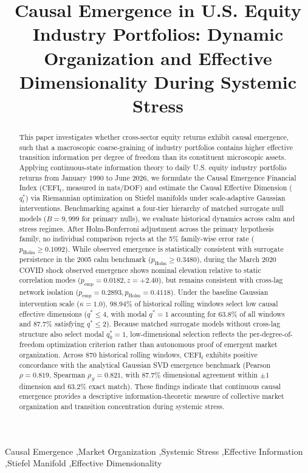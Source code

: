 \documentclass[review,12pt,authoryear]{elsarticle}
\begin{document}
\begin{frontmatter}

\title{Causal Emergence in U.S. Equity Industry Portfolios: Dynamic Organization and Effective Dimensionality During Systemic Stress}

\author{}

\begin{abstract}
This paper investigates whether cross-sector equity returns exhibit causal emergence, such that a macroscopic coarse-graining of industry portfolios contains higher effective transition information per degree of freedom than its constituent microscopic assets. Applying continuous-state information theory to daily U.S. equity industry portfolio returns from January 1990 to June 2026, we formulate the Causal Emergence Financial Index ($\mathrm{CEFI}_t$, measured in $\mathrm{nats/DOF}$) and estimate the Causal Effective Dimension ($q_t^*$) via Riemannian optimization on Stiefel manifolds under scale-adaptive Gaussian interventions. Benchmarking against a four-tier hierarchy of matched surrogate null models ($B=9,999$ for primary nulls), we evaluate historical dynamics across calm and stress regimes. After Holm-Bonferroni adjustment across the primary hypothesis family, no individual comparison rejects at the 5\% family-wise error rate ($p_{\text{Holm}} \ge 0.1092$). While observed emergence is statistically consistent with surrogate persistence in the 2005 calm benchmark ($p_{\text{Holm}} \ge 0.3480$), during the March 2020 COVID shock observed emergence shows nominal elevation relative to static correlation modes ($p_{\text{emp}} = 0.0182, z = +2.40$), but remains consistent with cross-lag network isolation ($p_{\text{emp}} = 0.2893, p_{\text{Holm}} = 0.4118$). Under the baseline Gaussian intervention scale ($\kappa = 1.0$), 98.94\% of historical rolling windows select low causal effective dimensions ($q^* \le 4$, with modal $q^* = 1$ accounting for 63.8\% of all windows and 87.7\% satisfying $q^* \le 2$). Because matched surrogate models without cross-lag structure also select modal $q_0^* = 1$, low-dimensional selection reflects the per-degree-of-freedom optimization criterion rather than autonomous proof of emergent market organization. Across 870 historical rolling windows, $\mathrm{CEFI}_t$ exhibits positive concordance with the analytical Gaussian SVD emergence benchmark (Pearson $\rho = 0.819$, Spearman $\rho_S = 0.821$, with 87.7\% dimensional agreement within $\pm 1$ dimension and 63.2\% exact match). These findings indicate that continuous causal emergence provides a descriptive information-theoretic measure of collective market organization and transition concentration during systemic stress.
\end{abstract}

\begin{keyword}
Causal Emergence \sep Market Organization \sep Systemic Stress \sep Effective Information \sep Stiefel Manifold \sep Effective Dimensionality
\end{keyword}

\end{frontmatter}
\end{document}
